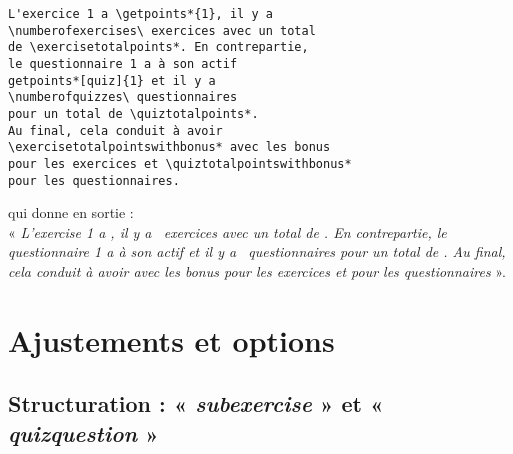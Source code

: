 \documentclass[
  twocolumn,%
  fontsize=9pt,%
  DIV=calc,%
  numbers=noendperiod%
]{scrartcl}
\newcommand{\lstcs}[1]{%
	\lstinline[%
		language={[LaTeX]{TeX}},%
		numberstyle=\small\ttfamily, 
		basicstyle=\ttfamily,
		texcsstyle=*\color{texcscolor}\bfseries,
		keywordstyle=\color{keywordcolor}\bfseries,
		identifierstyle=\color{black}\normalfont\ttfamily,
		commentstyle=\color{commentcolor}\itshape,%
		stringstyle=,%
		emphstyle=\color{emphcolor}\bfseries\textbackslash{},
		alsoletter={*},%
		literate=*%
			{-}{{\textcolor{texcscolor}{-}}}{1}
			{<}{{\textcolor{texcscolor}{<}}}{1}
			{>}{{\textcolor{texcscolor}{>}}}{1}
			{/}{{\textcolor{texcscolor}{/}}}{1}
			{\&}{{\textcolor{texcscolor}{\&}}}{1}
			{\{}{{\textcolor{texcscolor}{\{}}}{1}
			{\}}{{\textcolor{texcscolor}{\}}}}{1}
			{[}{{\textcolor{texcscolor}{[}}}{1}
			{]}{{\textcolor{texcscolor}{]}}}{1},
		keywords={%
			equal,
			tabular,
			enumerate,
			itemize,
			assignpoints,
			exercisepoints,
			exercise,
			quiz,
			subexercise,
			quizquestion,
			cleveref,
			caption,
		},%
		emph={%
			AtBeginExercise,
			AtEndExercise,
			AtBeginSubexercise,
			AtEndSubexercise,
			AtBeginQuiz,
			AtEndQuiz,
			AtBeginQuizquestion,
			AtQuizquestion,
			AtEndQuizquestion,
			assignpointsdecimalsep,
			assignpointsunitsingular,
			assignpointsunitplural,
			points,
			displaypoints,
			itempoints,
			itempoints*,
			getpoints,
			getpoints*,
			getbonuspoints,
			getbounuspoints*,
			numberofexercises,
			exercisetotalpoints,
			exercisetotalpoints*,
			numberofquizzes,
			quiztotalpoints,
			quiztotalpoints*,
			currentexercisenumber,
			currentexercisetitle,
			currentsubexercisenumber,
			currentsubexercisetitle,
			currentquiznumber,
			currentquiztitle,
			currentquizquestionnumber,
			currentquizquestiontitle,
			bonuspoints,
			getbonuspoints,
			getbonuspoints*,
			customlayout,
			totalpointswithbonus,
			exercisetotalpointswithbonus,
			exercisetotalpointswithbonus*,
			quiztotalpointswithbonus,
			quiztotalpointswithbonus*,
			exercisename,
			quizname,
			totalpointsname,
			setitempointsunit,
			currentexercisepoints,
			showcaseexercise,
			showcasequiz,
			showcaseexercise*,
			showcasequiz*
		}
	]!#1!%
}
\newcommand{\lstenv}[1]{%
	\lstinline[%
		basicstyle=\ttfamily,%
		texcsstyle=*\color{texcscolor}\bfseries,
		keywordstyle=\color{keywordcolor}\bfseries,%
		identifierstyle=\color{black}\normalfont\ttfamily,%
		alsoletter={*},
		literate=*%
			{/}{{\textcolor{keywordcolor}{/}}}{1},
		keywords={%
			equal,
			tabular,
			enumerate,
			itemize,
			assignpoints,
			exercisepoints,
			exercise,
			quiz,
			subexercise,
			quizquestion,
			cleveref,
			caption,
			TikZ,
			PGF,
			tcolorbox,
			breakable,
			etoolbox
		},%
	]!#1!%
}
\begin{document}
\begin{lstlisting}[emph={numberofexercises,exercisetotalpoints,exercisetotalpoints*,
	numberofquizzes,quiztotalpoints,quiztotalpoints*,getpoints,getpoints*,
	exercisetotalpointswithbonus,exercisetotalpointswithbonus*,
	quiztotalpointswithbonus,quiztotalpointswithbonus*}]
L'exercice 1 a \getpoints*{1}, il y a  
\numberofexercises\ exercices avec un total 
de \exercisetotalpoints*. En contrepartie, 
le questionnaire 1 a à son actif
getpoints*[quiz]{1} et il y a 
\numberofquizzes\ questionnaires 
pour un total de \quiztotalpoints*.
Au final, cela conduit à avoir
\exercisetotalpointswithbonus* avec les bonus 
pour les exercices et \quiztotalpointswithbonus* 
pour les questionnaires.
\end{lstlisting}
qui donne en sortie :\\
« \textit{L'exercise 1 a , il y a \numberofexercises\ exercices avec un total de \exercisetotalpoints*.
En contrepartie, le questionnaire 1 a à son actif  et il y a \numberofquizzes\ questionnaires pour un total 
de \quiztotalpoints*. Au final, cela conduit à avoir \exercisetotalpointswithbonus* avec les bonus pour les exercices et \quiztotalpointswithbonus* pour les questionnaires} ».





\section{Ajustements et options}
\label{sec:3}


\subsection{Structuration : « \textit{subexercise} » et « \textit{quizquestion} »}
\label{sub:3.1}
\end{document}
